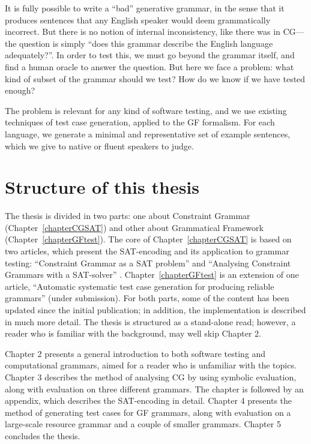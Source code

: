 It is fully possible to write a ``bad'' generative grammar, in the sense that it produces sentences that any English speaker would deem grammatically incorrect. But there is no notion of internal inconsistency, like there was in CG---the question is simply ``does this grammar describe the English language adequately?''.
In order to test this, we must go beyond the grammar itself, and find a human oracle to answer the question.
But here we face a problem: what kind of subset of the grammar should we test? How do we know if we have tested enough?

The problem is relevant for any kind of software testing, and we use existing techniques of test case generation, applied to the GF formalism. For each language, we generate a minimal and representative set of example sentences, which we give to native or fluent speakers to judge.

\section{Structure of this thesis}

The thesis is divided in two parts: one about Constraint Grammar (Chapter~\ref{chapterCGSAT}) and other about Grammatical Framework (Chapter~\ref{chapterGFtest}). The core of Chapter~\ref{chapterCGSAT} is based on two articles, which present the SAT-encoding and its application to grammar testing: ``Constraint Grammar as a SAT problem'' \cite{listenmaa_claessen2015} and ``Analysing Constraint Grammars with a SAT-solver'' \cite{listenmaa_claessen2016}. 
Chapter~\ref{chapterGFtest} is an extension of one article, ``Automatic systematic test case generation for producing reliable grammars'' \cite{listenmaa_claessen2018} (under submission). For both parts, some of the content has been updated since the initial publication; in addition, the implementation is described in much more detail. The thesis is structured as a stand-alone read; however, a reader who is familiar with the background, may well skip Chapter 2.

Chapter 2 presents a general introduction to both software testing and computational grammars, aimed for a reader who is unfamiliar with the topics.
Chapter 3 describes the method of analysing CG by using symbolic evaluation, along with evaluation on three different grammars.
The chapter is followed by an appendix, which describes the SAT-encoding in detail.
Chapter 4 presents the method of generating test cases for GF grammars, along with evaluation on a large-scale resource grammar and a couple of smaller grammars.
Chapter 5 concludes the thesis.


